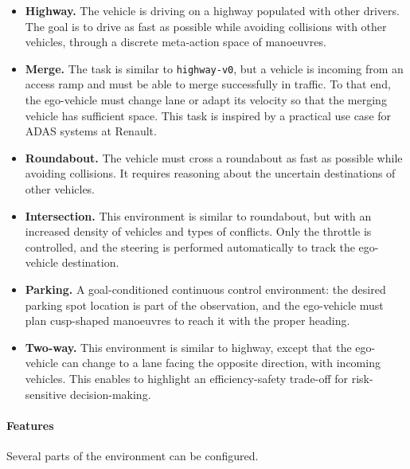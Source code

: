 \begin{itemize}
	\item \textbf{Highway.} The vehicle is driving on a highway populated with other drivers. The goal is to drive as fast as possible while avoiding collisions with other vehicles, through a discrete meta-action space of manoeuvres.
	\item \textbf{Merge.} The task is similar to \texttt{highway-v0}, but a vehicle is incoming from an access ramp and must be able to merge successfully in traffic. To that end, the ego-vehicle must change lane or adapt its velocity so that the merging vehicle has sufficient space. This task is inspired by a practical use case for \gls{ADAS} systems at Renault.
	\item \textbf{Roundabout.} The vehicle must cross a roundabout as fast as possible while avoiding collisions. It requires reasoning about the uncertain destinations of other vehicles.
	\item \textbf{Intersection.} This environment is similar to roundabout, but with an increased density of vehicles and types of conflicts. Only the throttle is controlled, and the steering is performed automatically to track the ego-vehicle destination.
	\item \textbf{Parking.} A goal-conditioned continuous control environment: the desired parking spot location is part of the observation, and the ego-vehicle must plan cusp-shaped manoeuvres to reach it with the proper heading.
	\item \textbf{Two-way.} This environment is similar to highway, except that the ego-vehicle can change to a lane facing the opposite direction, with incoming vehicles. This enables to highlight an efficiency-safety trade-off for risk-sensitive decision-making.
\end{itemize}

\paragraph{Features}

Several parts of the environment can be configured.

